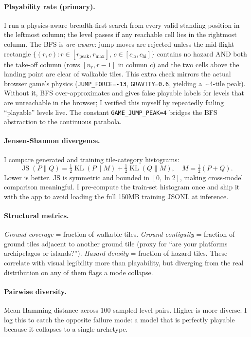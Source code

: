 \documentclass[11pt]{article}
\begin{document}
\paragraph{Playability rate (primary).}
I run a physics-aware breadth-first search from every valid standing
position in the leftmost column; the level passes if any reachable
cell lies in the rightmost column. The BFS is \emph{arc-aware}: jump
moves are rejected unless the mid-flight rectangle
$\{(r,c): r\in[r_\text{peak}, r_\text{max}],\, c\in[c_\text{lo}, c_\text{hi}]\}$
contains no hazard AND both the take-off column (rows
$[n_r, r-1]$ in column $c$) and the two cells above the landing point
are clear of walkable tiles. This extra check mirrors the actual
browser game's physics (\texttt{JUMP\_FORCE=-13}, \texttt{GRAVITY=0.6},
yielding a $\sim$4-tile peak). Without it, BFS over-approximates and
gives false playable labels for levels that are unreachable in the
browser; I verified this myself by repeatedly failing ``playable''
levels live. The constant \texttt{GAME\_JUMP\_PEAK=4} bridges the BFS
abstraction to the continuous parabola.

\paragraph{Jensen-Shannon divergence.}
I compare generated and training tile-category histograms:
\[
\operatorname{JS}(P \| Q) = \tfrac{1}{2} \operatorname{KL}(P \| M) + \tfrac{1}{2} \operatorname{KL}(Q \| M),
\quad M = \tfrac{1}{2}(P+Q).
\]
Lower is better. JS is symmetric and bounded in $[0,\ln 2]$, making
cross-model comparison meaningful. I pre-compute the train-set
histogram once and ship it with the app to avoid loading the full
150MB training JSONL at inference.

\paragraph{Structural metrics.}
\emph{Ground coverage} = fraction of walkable tiles.
\emph{Ground contiguity} = fraction of ground tiles adjacent to another
ground tile (proxy for ``are your platforms archipelagos or islands?'').
\emph{Hazard density} = fraction of hazard tiles. These correlate with
visual legibility more than playability, but diverging from the real
distribution on any of them flags a mode collapse.

\paragraph{Pairwise diversity.}
Mean Hamming distance across 100 sampled level pairs. Higher is more
diverse. I log this to catch the opposite failure mode: a model that
is perfectly playable because it collapses to a single archetype.
\end{document}

